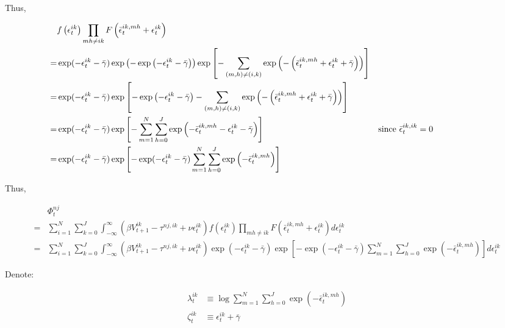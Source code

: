 \documentclass[10pt]{article}
\begin{document}
Thus,

\begin{align}
    &f\left(\epsilon_t^{i k}\right) \prod_{m h \neq i k} F\left(\bar{\epsilon}_t^{i k, m h}+\epsilon_t^{i k}\right) \\
    = &\exp ( - \epsilon_t^{i k} - \bar{\gamma}) \exp \left( -\exp \left( - \epsilon_t^{i k} - \bar{\gamma} \right) \right)
        \exp \left[-\sum_{(m, h) \neq(i, k)} \exp \left(-\left(\bar{\epsilon}_t^{i k, m h}+\epsilon_t^{i k}+\bar{\gamma}\right)\right)\right] \\
    = & \exp ( - \epsilon_t^{i k} - \bar{\gamma}) \exp \left[ -\exp \left( - \epsilon_t^{i k} - \bar{\gamma} \right) - \sum_{(m, h) \neq(i, k)} \exp \left(-\left(\bar{\epsilon}_t^{i k, m h}+\epsilon_t^{i k}+\bar{\gamma}\right)\right) \right] \\
    = & \exp ( - \epsilon_t^{i k} - \bar{\gamma}) \exp \left[  - \sum_{m=1}^N \sum_{h=0}^J \exp \left( -\bar{\epsilon}_t^{i k, m h}-\epsilon_t^{i k}-\bar{\gamma} \right) \right] && \parbox[t]{4cm}{\raggedright since $\bar{\epsilon}_t^{i k, i k} = 0$} \\
    = & \exp ( - \epsilon_t^{i k} - \bar{\gamma}) \exp \left[ - \exp(-\epsilon_t^{i k} - \bar{\gamma}) \sum_{m=1}^N \sum_{h=0}^J \exp \left( -\bar{\epsilon}_t^{i k, m h} \right) \right] 
\end{align}

Thus,

\begin{align}
    &\Phi_t^{n j} \\
    =&\sum_{i=1}^N \sum_{k=0}^J \int_{-\infty}^{\infty}\left(\beta V_{t+1}^{i k}-\tau^{n j, i k}+\nu \epsilon_t^{i k}\right) f\left(\epsilon_t^{i k}\right) \prod_{m h \neq i k} F\left(\bar{\epsilon}_t^{i k, m h}+\epsilon_t^{i k}\right) d \epsilon_t^{i k} \\
    = &\sum_{i=1}^N \sum_{k=0}^J \int_{-\infty}^{\infty}\left(\beta V_{t+1}^{i k}-\tau^{n j, i k}+\nu \epsilon_t^{i k}\right) \exp ( - \epsilon_t^{i k} - \bar{\gamma}) \exp \left[ - \exp(-\epsilon_t^{i k} - \bar{\gamma}) \sum_{m=1}^N \sum_{h=0}^J \exp \left( -\bar{\epsilon}_t^{i k, m h} \right) \right] d \epsilon_t^{i k}
\end{align}

Denote:

\begin{align}
    \lambda_t^{i k} &\equiv \log \sum_{m=1}^N \sum_{h=0}^J \exp \left(-\bar{\epsilon}_t^{i k, m h}\right) \\
    \zeta_t^{i k} &\equiv \epsilon_t^{i k}+\bar{\gamma}
\end{align}
\end{document}
